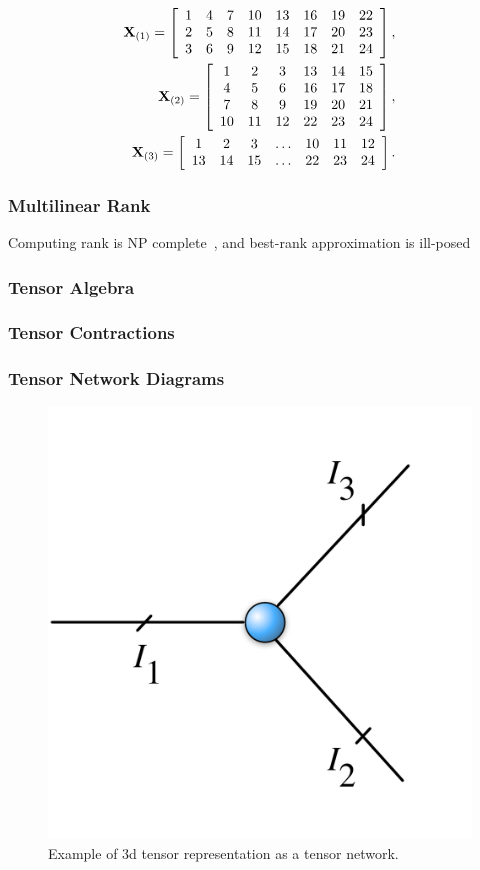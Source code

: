 \begin{equation}
\label{eq:moden-matricization}
\begin{split}
\M{X}_{(1)} = \left[
\begin{array}{cccccccc}
1 & 4 & 7 & 10 & 13 & 16 & 19 & 22 \\
2 & 5 & 8 & 11 & 14 & 17 & 20 & 23 \\
3 & 6 & 9 & 12 & 15 & 18 & 21 & 24 
\end{array}
\right],\\
\M{X}_{(2)} = \left[
\begin{array}{cccccc}
1 & 2 & 3 & 13 & 14 & 15 \\
4 & 5 & 6 & 16 & 17 & 18 \\
7 & 8 & 9 & 19 & 20 & 21 \\
10 & 11 & 12 & 22 & 23 & 24 
\end{array}
\right],\\
\M{X}_{(3)} = \left[
\begin{array}{ccccccc}
1 & 2 & 3 & \dots & 10 & 11 & 12 \\
13 & 14 & 15 & \dots & 22 & 23 & 24
\end{array}
\right].
\end{split}
\end{equation}

\subsubsection{Multilinear Rank}
Computing rank is NP complete~\cite{HastadRanknp}, and best-rank approximation is ill-posed~\cite{Kolda:2009}
\subsubsection{Tensor Algebra}

\subsubsection{Tensor Contractions}

\subsubsection{Tensor Network Diagrams}
\begin{figure}
  \centering\includegraphics[width=0.3\linewidth]{figs/3dtensornet}
  \caption{Example of 3d tensor representation as a tensor network.}
  \label{fig:3dtensornet}
\end{figure}
